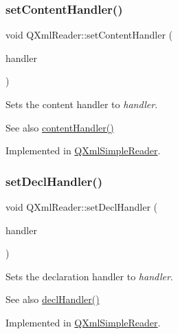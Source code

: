 \subsubsection{\texorpdfstring{setContentHandler()}{setContentHandler()}}
{\footnotesize\ttfamily void Q\+Xml\+Reader\+::set\+Content\+Handler (\begin{DoxyParamCaption}\item[{\mbox{\hyperlink{class_q_xml_content_handler}{Q\+Xml\+Content\+Handler}} $\ast$}]{handler }\end{DoxyParamCaption})\hspace{0.3cm}{\ttfamily [pure virtual]}}

Sets the content handler to {\itshape handler}.

\begin{DoxySeeAlso}{See also}
\mbox{\hyperlink{class_q_xml_reader_ae86bc7841c2dbf289b300a1b00f93187}{content\+Handler()}} 
\end{DoxySeeAlso}


Implemented in \mbox{\hyperlink{class_q_xml_simple_reader_ae3561b9c7507e03b87534f505fec2857}{Q\+Xml\+Simple\+Reader}}.

\mbox{\label{class_q_xml_reader_a6d16a9420620f829cacb2cdb256d80a7}} 
\subsubsection{\texorpdfstring{setDeclHandler()}{setDeclHandler()}}
{\footnotesize\ttfamily void Q\+Xml\+Reader\+::set\+Decl\+Handler (\begin{DoxyParamCaption}\item[{\mbox{\hyperlink{class_q_xml_decl_handler}{Q\+Xml\+Decl\+Handler}} $\ast$}]{handler }\end{DoxyParamCaption})\hspace{0.3cm}{\ttfamily [pure virtual]}}

Sets the declaration handler to {\itshape handler}.

\begin{DoxySeeAlso}{See also}
\mbox{\hyperlink{class_q_xml_reader_a635ea0540ef702ccd0db0a15958d3fea}{decl\+Handler()}} 
\end{DoxySeeAlso}


Implemented in \mbox{\hyperlink{class_q_xml_simple_reader_ace5ca778d4b51af1883a8d72a99fb436}{Q\+Xml\+Simple\+Reader}}.

